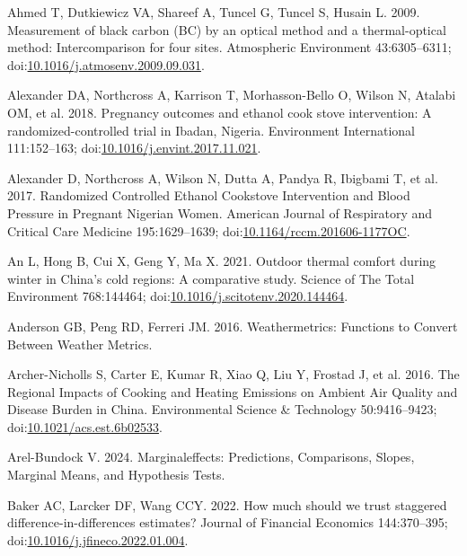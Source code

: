 \documentclass[
  letterpaper,
  DIV=11,
  numbers=noendperiod]{scrartcl}
\newlength{\cslhangindent}
\newenvironment{CSLReferences}[2] %
 {\begin{list}{}{%
  \setlength{\itemindent}{0pt}
  \setlength{\leftmargin}{0pt}
  \setlength{\parsep}{0pt}
  \ifodd #1
   \setlength{\leftmargin}{\cslhangindent}
   \setlength{\itemindent}{-1\cslhangindent}
  \fi
  \setlength{\itemsep}{#2\baselineskip}}}
 {\end{list}}
\begin{document}
\label{refs}
\begin{CSLReferences}{1}{1}
Ahmed T, Dutkiewicz VA, Shareef A, Tuncel G, Tuncel S, Husain L. 2009.
Measurement of black carbon ({BC}) by an optical method and a
thermal-optical method: {Intercomparison} for four sites. Atmospheric
Environment 43:6305--6311;
doi:\href{https://doi.org/10.1016/j.atmosenv.2009.09.031}{10.1016/j.atmosenv.2009.09.031}.

Alexander DA, Northcross A, Karrison T, Morhasson-Bello O, Wilson N,
Atalabi OM, et al. 2018. Pregnancy outcomes and ethanol cook stove
intervention: {A} randomized-controlled trial in {Ibadan}, {Nigeria}.
Environment International 111:152--163;
doi:\href{https://doi.org/10.1016/j.envint.2017.11.021}{10.1016/j.envint.2017.11.021}.

Alexander D, Northcross A, Wilson N, Dutta A, Pandya R, Ibigbami T, et
al. 2017. Randomized {Controlled Ethanol Cookstove Intervention} and
{Blood Pressure} in {Pregnant Nigerian Women}. American Journal of
Respiratory and Critical Care Medicine 195:1629--1639;
doi:\href{https://doi.org/10.1164/rccm.201606-1177OC}{10.1164/rccm.201606-1177OC}.

An L, Hong B, Cui X, Geng Y, Ma X. 2021. Outdoor thermal comfort during
winter in {China}'s cold regions: {A} comparative study. Science of The
Total Environment 768:144464;
doi:\href{https://doi.org/10.1016/j.scitotenv.2020.144464}{10.1016/j.scitotenv.2020.144464}.

Anderson GB, Peng RD, Ferreri JM. 2016. Weathermetrics: {Functions} to
{Convert Between Weather Metrics}.

Archer-Nicholls S, Carter E, Kumar R, Xiao Q, Liu Y, Frostad J, et al.
2016. The {Regional Impacts} of {Cooking} and {Heating Emissions} on
{Ambient Air Quality} and {Disease Burden} in {China}. Environmental
Science \& Technology 50:9416--9423;
doi:\href{https://doi.org/10.1021/acs.est.6b02533}{10.1021/acs.est.6b02533}.

Arel-Bundock V. 2024. Marginaleffects: {Predictions}, {Comparisons},
{Slopes}, {Marginal Means}, and {Hypothesis Tests}.

Baker AC, Larcker DF, Wang CCY. 2022. How much should we trust staggered
difference-in-differences estimates? Journal of Financial Economics
144:370--395;
doi:\href{https://doi.org/10.1016/j.jfineco.2022.01.004}{10.1016/j.jfineco.2022.01.004}.


\end{CSLReferences}
\end{document}
